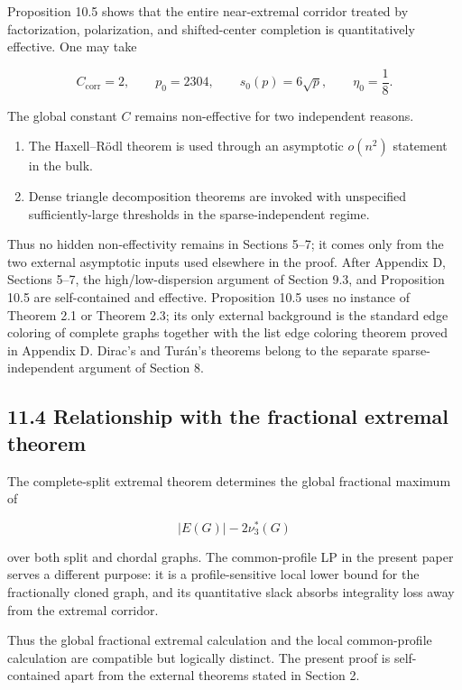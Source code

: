 \documentclass[
  11pt,
]{article}
\providecommand{\tightlist}{%
  \setlength{\itemsep}{0pt}\setlength{\parskip}{0pt}}
\begin{document}
Proposition 10.5 shows that the entire near-extremal corridor treated by
factorization, polarization, and shifted-center completion is
quantitatively effective. One may take

\[
C_{\mathrm{corr}}=2,
\qquad
p_0=2304,
\qquad
s_0(p)=6\sqrt p,
\qquad
\eta_0=\frac18.
\]

The global constant \(C\) remains non-effective for two independent
reasons.

\begin{enumerate}
\def\labelenumi{\arabic{enumi}.}
\tightlist
\item
  The Haxell--Rödl theorem is used through an asymptotic \(o(n^2)\)
  statement in the bulk.
\item
  Dense triangle decomposition theorems are invoked with unspecified
  sufficiently-large thresholds in the sparse-independent regime.
\end{enumerate}

Thus no hidden non-effectivity remains in Sections 5--7; it comes only
from the two external asymptotic inputs used elsewhere in the proof.
After Appendix D, Sections 5--7, the high/low-dispersion argument of
Section 9.3, and Proposition 10.5 are self-contained and effective.
Proposition 10.5 uses no instance of Theorem 2.1 or Theorem 2.3; its
only external background is the standard edge coloring of complete
graphs together with the list edge coloring theorem proved in Appendix
D. Dirac's and Turán's theorems belong to the separate
sparse-independent argument of Section 8.

\subsection{11.4 Relationship with the fractional extremal
theorem}\label{relationship-with-the-fractional-extremal-theorem}

The complete-split extremal theorem determines the global fractional
maximum of

\[
|E(G)|-2\nu_3^*(G)
\]

over both split and chordal graphs. The common-profile LP in the present
paper serves a different purpose: it is a profile-sensitive local lower
bound for the fractionally cloned graph, and its quantitative slack
absorbs integrality loss away from the extremal corridor.

Thus the global fractional extremal calculation and the local
common-profile calculation are compatible but logically distinct. The
present proof is self-contained apart from the external theorems stated
in Section 2.
\end{document}

